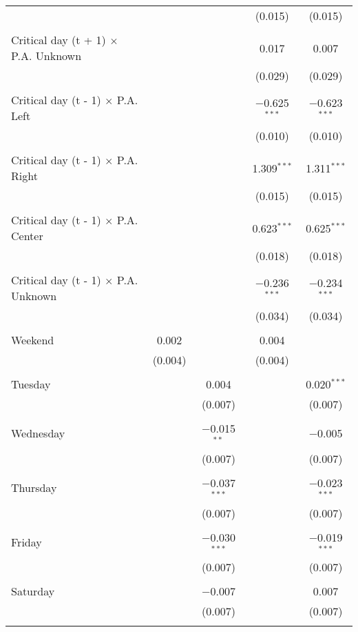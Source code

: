 \documentclass[
]{article}
\begin{document}
\begin{table}[!htbp]
{\begin{tabular}{@{\extracolsep{5pt}}lcccc}
  &  &  & (0.015) & (0.015) \\ 
  & & & & \\ 
 Critical day (t + 1) $\times$ P.A. Unknown &  &  & 0.017 & 0.007 \\ 
  &  &  & (0.029) & (0.029) \\ 
  & & & & \\ 
 Critical day (t - 1) $\times$ P.A. Left &  &  & $-$0.625$^{***}$ & $-$0.623$^{***}$ \\ 
  &  &  & (0.010) & (0.010) \\ 
  & & & & \\ 
 Critical day (t - 1) $\times$ P.A. Right &  &  & 1.309$^{***}$ & 1.311$^{***}$ \\ 
  &  &  & (0.015) & (0.015) \\ 
  & & & & \\ 
 Critical day (t - 1) $\times$ P.A. Center &  &  & 0.623$^{***}$ & 0.625$^{***}$ \\ 
  &  &  & (0.018) & (0.018) \\ 
  & & & & \\ 
 Critical day (t - 1) $\times$ P.A. Unknown &  &  & $-$0.236$^{***}$ & $-$0.234$^{***}$ \\ 
  &  &  & (0.034) & (0.034) \\ 
  & & & & \\ 
 Weekend & 0.002 &  & 0.004 &  \\ 
  & (0.004) &  & (0.004) &  \\ 
  & & & & \\ 
 Tuesday &  & 0.004 &  & 0.020$^{***}$ \\ 
  &  & (0.007) &  & (0.007) \\ 
  & & & & \\ 
 Wednesday &  & $-$0.015$^{**}$ &  & $-$0.005 \\ 
  &  & (0.007) &  & (0.007) \\ 
  & & & & \\ 
 Thursday &  & $-$0.037$^{***}$ &  & $-$0.023$^{***}$ \\ 
  &  & (0.007) &  & (0.007) \\ 
  & & & & \\ 
 Friday &  & $-$0.030$^{***}$ &  & $-$0.019$^{***}$ \\ 
  &  & (0.007) &  & (0.007) \\ 
  & & & & \\ 
 Saturday &  & $-$0.007 &  & 0.007 \\ 
  &  & (0.007) &  & (0.007) \\ 
  & & & & \\ 

\end{tabular}}
\end{table}
\end{document}
